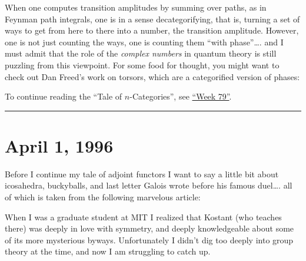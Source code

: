 \documentclass{article}
\def\tightlist{}
\renewcommand{\texttt}[1]{%
  \begingroup
  \ttfamily
  \begingroup\lccode`~=`/\lowercase{\endgroup\def~}{/\discretionary{}{}{}}%
  \begingroup\lccode`~=`[\lowercase{\endgroup\def~}{[\discretionary{}{}{}}%
  \begingroup\lccode`~=`.\lowercase{\endgroup\def~}{.\discretionary{}{}{}}%
  \catcode`/=\active\catcode`[=\active\catcode`.=\active
  \scantokens{#1\noexpand}%
  \endgroup
}
\begin{document}
When one computes transition amplitudes by summing over paths, as in
Feynman path integrals, one is in a sense decategorifying, that is,
turning a set of ways to get from here to there into a number, the
transition amplitude. However, one is not just counting the ways, one is
counting them ``with phase''\ldots. and I must admit that the role of
the \emph{complex numbers} in quantum theory is still puzzling from this
viewpoint. For some food for thought, you might want to check out Dan
Freed's work on torsors, which are a categorified version of phases:


To continue reading the ``Tale of \(n\)-Categories'', see
\protect\hyperlink{week79}{``Week 79''}.

\begin{center}\rule{0.5\linewidth}{0.5pt}\end{center}
\hypertarget{week79}{%
\section{April 1, 1996}\label{week79}}

Before I continue my tale of adjoint functors I want to say a little bit
about icosahedra, buckyballs, and last letter Galois wrote before his
famous duel\ldots. all of which is taken from the following marvelous
article:


When I was a graduate student at MIT I realized that Kostant (who
teaches there) was deeply in love with symmetry, and deeply
knowledgeable about some of its more mysterious byways. Unfortunately I
didn't dig too deeply into group theory at the time, and now I am
struggling to catch up.
\end{document}
